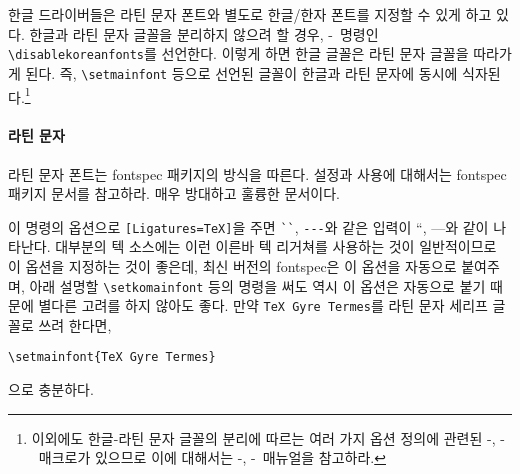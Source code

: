\documentclass[
	12pt,
	a4paper,
	kosection,
	footnote,
	nobookmarks,
	microtype,
]{oblivoir}
\def\cs#1{\texttt{\textbackslash #1}}
\def\ct#1{\texttt{#1}}
\def\xetexko{\XeTeX-\ko}
\def\luatexko{\LuaTeX-\ko}
\begin{document}
한글 드라이버들은 라틴 문자 폰트와 별도로 한글/한자 폰트를 지정할 수 있게 하고 있다.
한글과 라틴 문자 글꼴을 분리하지 않으려 할 경우, 
\xetexko\ 명령인
\verb|\disablekoreanfonts|를 선언한다.
이렇게 하면 한글 글꼴은
라틴 문자 글꼴을 따라가게 된다. 즉, \texttt{\textbackslash setmainfont}
등으로 선언된 글꼴이 한글과 라틴 문자에 동시에 식자된다.\footnote{%
 이외에도 한글-라틴 문자 글꼴의 분리에 따르는 여러 가지 옵션 정의에 관련된
 \xetexko, \luatexko\ 매크로가 있으므로 이에 대해서는 \xetexko, \luatexko\ 매뉴얼을
 참고하라.
}

\paragraph{라틴 문자}
라틴 문자 폰트는 fontspec 패키지의 방식을 따른다.
설정과 사용에 대해서는 fontspec 패키지 문서를 참고하라.
매우 방대하고 훌륭한 문서이다.

\begin{boxedverbatim}
\setmainfont{<Font Name>}
\setsansfont{...}
\setmonofont{...}
\end{boxedverbatim}

이 명령의 옵션으로 \verb|[Ligatures=TeX]|을 주면 \verb|``|, \verb|---|와 같은 
입력이 ``, ---와 같이 나타난다. 대부분의 텍 소스에는 이런 이른바 텍 리거쳐를 사용하는 것이
일반적이므로 이 옵션을 지정하는 것이 좋은데, 최신 버전의 fontspec은 이 옵션을 자동으로 붙여주며,
아래 설명할 \cs{setkomainfont} 등의 명령을 써도 역시 이 옵션은 자동으로 붙기 때문에 별다른 고려를 하지 않아도 좋다.
만약 \ct{TeX Gyre Termes}를 라틴 문자 세리프 글꼴로 쓰려 한다면,
\begin{verbatim}
\setmainfont{TeX Gyre Termes}
\end{verbatim}
으로 충분하다.
\end{document}
